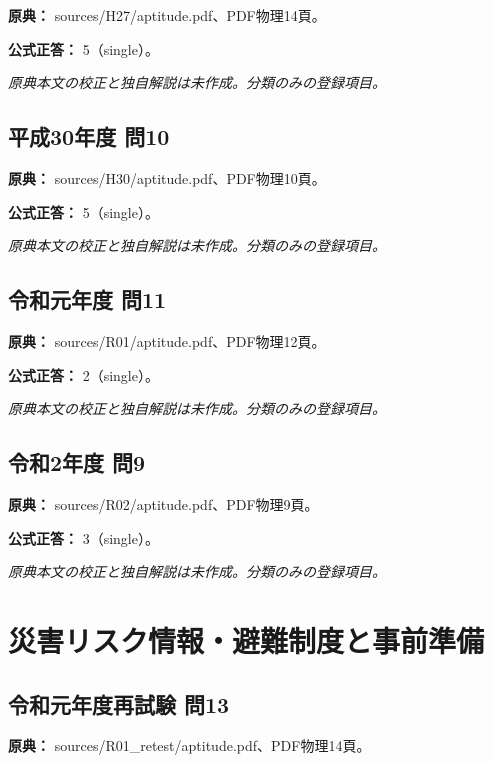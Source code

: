 \noindent\textbf{原典：} sources/H27/aptitude.pdf、PDF物理14頁。

\textbf{公式正答：} 5（single）。

\par\textit{原典本文の校正と独自解説は未作成。分類のみの登録項目。}

\subsection{平成30年度 問10}
\label{q:h30-reg-apt-10}

\noindent\textbf{原典：} sources/H30/aptitude.pdf、PDF物理10頁。

\textbf{公式正答：} 5（single）。

\par\textit{原典本文の校正と独自解説は未作成。分類のみの登録項目。}

\subsection{令和元年度 問11}
\label{q:r01-reg-apt-11}

\noindent\textbf{原典：} sources/R01/aptitude.pdf、PDF物理12頁。

\textbf{公式正答：} 2（single）。

\par\textit{原典本文の校正と独自解説は未作成。分類のみの登録項目。}

\subsection{令和2年度 問9}
\label{q:r02-reg-apt-09}

\noindent\textbf{原典：} sources/R02/aptitude.pdf、PDF物理9頁。

\textbf{公式正答：} 3（single）。

\par\textit{原典本文の校正と独自解説は未作成。分類のみの登録項目。}

\section{災害リスク情報・避難制度と事前準備}

\subsection{令和元年度再試験 問13}
\label{q:r01-ret-apt-13}

\noindent\textbf{原典：} sources/R01\_retest/aptitude.pdf、PDF物理14頁。


